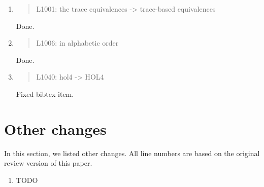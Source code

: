 \begin{enumerate}
\item \begin{quote}
    L1001: the trace equivalences -> trace-based equivalences
  \end{quote}
  Done.
  
\item \begin{quote}
    L1006: in alphabetic order
  \end{quote}
  Done.
  
\item \begin{quote}
    L1040: hol4 -> HOL4
  \end{quote}
  Fixed bibtex item.
  
\end{enumerate}

\section*{Other changes}

In this section, we listed other changes. All line numbers are based
on the original review version of this paper.

\begin{enumerate}
\item TODO
\end{enumerate}
